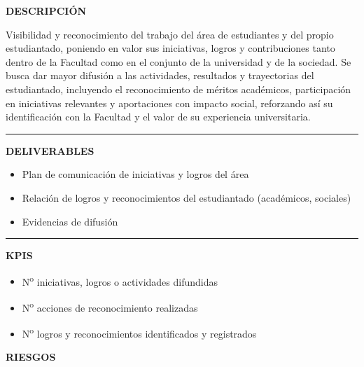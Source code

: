 \documentclass[11pt,a4paper]{scrreprt}
\newcommand{\fieldlabel}[1]{%
  {\footnotesize\sffamily\bfseries\color{mutedcolor}\MakeUppercase{#1}}\par\nopagebreak[4]
}
\newcommand{\fieldsep}{\vspace{3pt}\noindent\textcolor{bordercolor}{\rule{\linewidth}{0.4pt}}\vspace{3pt}\par}
\begin{document}
\begin{tcolorbox}[pabox={e360color}{PA4.1 \enspace\textbullet\enspace Puesta en valor del trabajo del área de estudiantes y del estudiantado}]

\fieldlabel{Descripci\'on}
{\small Visibilidad y reconocimiento del trabajo del área de estudiantes y del propio estudiantado, poniendo en valor sus iniciativas, logros y contribuciones tanto dentro de la Facultad como en el conjunto de la universidad y de la sociedad. Se busca dar mayor difusión a las actividades, resultados y trayectorias del estudiantado, incluyendo el reconocimiento de méritos académicos, participación en iniciativas relevantes y aportaciones con impacto social, reforzando así su identificación con la Facultad y el valor de su experiencia universitaria. }\par
\fieldsep
\fieldlabel{Deliverables}
{\small \begin{itemize}[noitemsep,topsep=2pt]
\item Plan de comunicación de iniciativas y logros del área
\item Relación de logros y reconocimientos del estudiantado (académicos, sociales)
\item Evidencias de difusión
\end{itemize}}\par
\fieldsep
\fieldlabel{KPIs}
{\small \begin{itemize}[noitemsep,topsep=2pt]
\item N\textsuperscript{o} iniciativas, logros o actividades difundidas
\item N\textsuperscript{o} acciones de reconocimiento realizadas
\item N\textsuperscript{o} logros y reconocimientos identificados y registrados
\end{itemize}}\par
\end{tcolorbox}
\begin{tcolorbox}[riskbox]
{\footnotesize\sffamily\bfseries\color{red!50!black} RIESGOS}\par{}
\end{tcolorbox}
\end{document}
